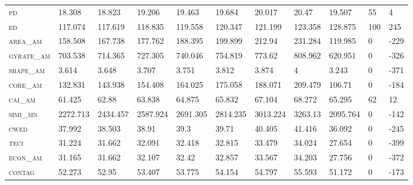 \begin{landscape}
\begin{table}[!htbp]
\begin{tabular}{@{}lllllllllll@{}}
\small \textsc{pd}              & 18.308       & 18.823      & 19.206        & 19.463       & 19.684        & 20.017        & 20.47         & 19.507      & 55     & 4    \\
\small \textsc{ed}              & 117.074       & 117.619      & 118.835        & 119.558       & 120.347        & 121.199        & 123.358         & 128.875      & 100     & 245    \\
\small \textsc{area\_am}        & 158.508       & 167.738      & 177.762        & 188.395       & 199.899        & 212.94        & 231.284         & 119.985      & 0     & -229     \\
\small \textsc{gyrate\_am}      & 703.538       & 714.365      & 727.305        & 740.046       & 754.819        & 773.62        & 808.962         & 620.951      & 0     & -326     \\
\small \textsc{shape\_am}       & 3.614       & 3.648      & 3.707        & 3.751       & 3.812        & 3.874        & 4         & 3.243      & 0     & -371     \\
\small \textsc{core\_am}        & 132.831       & 143.938      & 154.408        & 164.025       & 175.058        & 188.071        & 209.479         & 106.71      & 0     & -184     \\
\small \textsc{cai\_am}         & 61.425       & 62.88      & 63.838        & 64.875       & 65.832        & 67.104        & 68.272         & 65.295      & 62     & 12   \\
\small \textsc{simi\_mn}        & 2272.713       & 2434.457      & 2587.924        & 2691.305       & 2814.235        & 3013.224        & 3263.13         & 2095.764      & 0     & -142     \\
\small \textsc{cwed}            & 37.992       & 38.503      & 38.91        & 39.3       & 39.71        & 40.405        & 41.416         & 36.092      & 0     & -245     \\
\small \textsc{teci}            & 31.224       & 31.662      & 32.091        & 32.418       & 32.815        & 33.479        & 34.024         & 27.654      & 0     & -399     \\
\small \textsc{econ\_am}        & 31.165       & 31.662      & 32.107        & 32.42       & 32.857        & 33.567        & 34.203         & 27.756      & 0     & -372     \\
\small \textsc{contag}          & 52.273       & 52.95      & 53.407        & 53.775       & 54.154        & 54.797        & 55.593         & 51.172      & 0     & -173     \\

\end{tabular}
\end{table}
\end{landscape}
